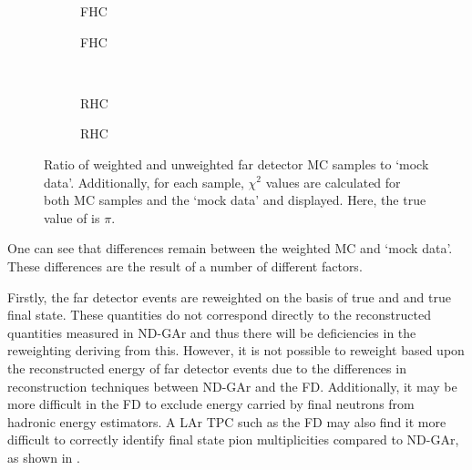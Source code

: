 \begin{figure}[h]
	\begin{subfigure}[t]{.5\linewidth}
		\begin{adjustbox}{max totalsize=\linewidth, center}
			
		\end{adjustbox}
		\caption{FHC \numu}
	\end{subfigure}
	\hfill
	\begin{subfigure}[t]{.5\linewidth}
		\begin{adjustbox}{max totalsize=\linewidth, center}
			
		\end{adjustbox}
		\caption{FHC \nue}
	\end{subfigure} \\
	\begin{subfigure}[t]{.5\linewidth}
		\begin{adjustbox}{max totalsize=\linewidth, center}
			
		\end{adjustbox}
		\caption{RHC \anumu}
	\end{subfigure}
	\hfill
	\begin{subfigure}[t]{.5\linewidth}
		\begin{adjustbox}{max totalsize=\linewidth, center}
			
		\end{adjustbox}
		\caption{RHC \anue}
	\end{subfigure}
	\caption[Ratio of weighted and unweighted far detector MC samples to `mock data']{Ratio of weighted and unweighted far detector MC samples to `mock data'. Additionally, for each sample, $\chi^{2}$ values are calculated for both MC samples and the `mock data' and displayed. Here, the true value of \dcp is $\pi$.}
	\label{fig:reweightedSamplesRatio}
\end{figure} 

One can see that differences remain between the weighted MC and `mock data'. 
These differences are the result of a number of different factors.

Firstly, the far detector events are reweighted on the basis of true \evis and \pvis and true final state.
These quantities do not correspond directly to the reconstructed quantities measured in ND-GAr and thus there will be deficiencies in the reweighting deriving from this.
However, it is not possible to reweight based upon the reconstructed energy of far detector events due to the differences in reconstruction techniques between ND-GAr and the FD.
Additionally, it may be more difficult in the FD to exclude energy carried by final neutrons from hadronic energy estimators.
A LAr TPC such as the FD may also find it more difficult to correctly identify final state pion multiplicities compared to ND-GAr, as shown in .

